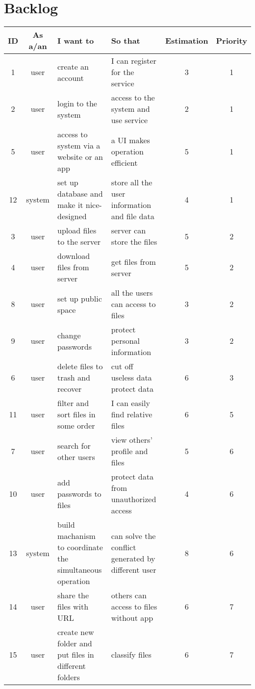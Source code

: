 \documentclass[a4paper,11pt]{article}
\begin{document}
\section{Backlog}
\begin{table}[H]
\centering
\begin{tabular}{|c|c|p{4cm}|p{4cm}|c|c|}
\hline
ID & As a/an & I want to & So that & Estimation & Priority
\\
\hline
1 & user & create an account & I can register for the  service & 3 & 1
\\
\hline
2 & user & login to the system & access to the system and use service & 2 & 1
\\
\hline
5 & user & access to system via a website or an app & a UI makes operation efficient & 5 & 1
\\
\hline
12 & system & set up database and make it nice-designed & store all the user information and file data & 4 & 1
\\
\hline
3 & user & upload files to the server & server can store the files & 5 & 2
\\
\hline
4 & user & download files from server & get files from server & 5 & 2
\\
\hline
8 & user & set up public  space & all the users can access to files & 3 & 2
\\
\hline
9 & user & change  passwords & protect personal information & 3 & 2
\\
\hline
6 & user & delete files to trash and  recover & cut off useless data protect data & 6 & 3
\\
\hline
11 & user & filter and sort files in some order & I can easily find relative files & 6 & 5
\\
\hline
7 & user & search for other users & view  others' profile and files & 5 & 6
\\
\hline
10 & user & add passwords to files & protect data from unauthorized access & 4 & 6
\\
\hline
13 & system & build machanism to  coordinate the simultaneous operation & can solve the conflict generated by different user & 8 & 6
\\
\hline
14 & user & share the files with URL & others can access to files without app & 6 & 7
\\
\hline
15 & user & create new folder and put files in different folders & classify files & 6 & 7
\\
\hline
\end{tabular}
\end{table}
\end{document}
